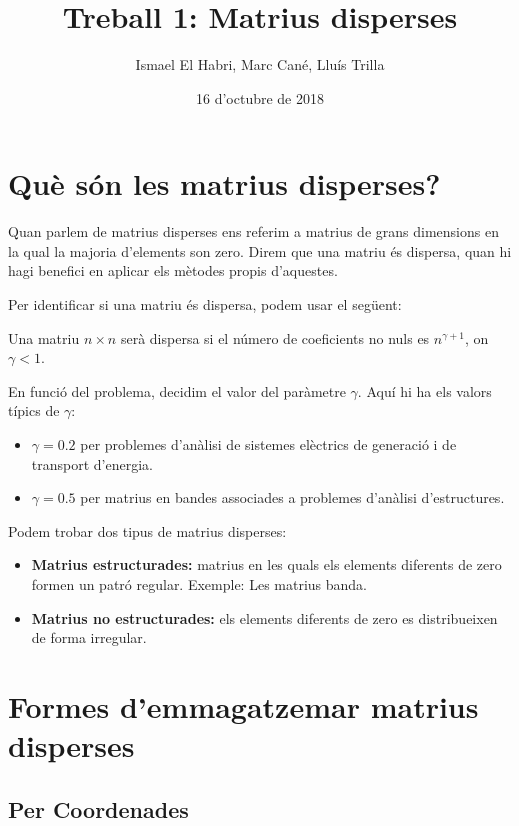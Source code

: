 \documentclass[11pt,a4paper,twoside]{report}
\begin{document}
\title{Treball 1: Matrius disperses}
\author{Ismael El Habri, Marc Cané, Lluís Trilla}
\date{16 d'octubre de 2018}
\maketitle

\tableofcontents


\chapter{Què són les matrius disperses?}

Quan parlem de matrius disperses ens referim a matrius de grans dimensions en la qual la majoria d'elements son zero. Direm que una matriu és dispersa, quan hi hagi benefici en aplicar els mètodes propis d'aquestes. 

Per identificar si una matriu és dispersa, podem usar el següent:

\qquad Una matriu $n \times n$ serà dispersa si el número de coeficients no nuls es $n^{\gamma+1}$, on $\gamma < 1$.

En funció del problema, decidim el valor del paràmetre $\gamma$. Aquí hi ha els valors típics de $\gamma$:
\begin{itemize}
\item $\gamma=0.2$ per problemes d'anàlisi de sistemes elèctrics de generació i de transport d'energia.
\item $\gamma=0.5$ per matrius en bandes associades a problemes d'anàlisi d'estructures.
\end {itemize}



Podem trobar dos tipus de matrius disperses:
\begin{itemize}
\item \textbf{Matrius estructurades:} matrius en les quals els elements diferents de zero formen un patró regular. Exemple: Les matrius banda.
\item \textbf{Matrius no estructurades:} els elements diferents de zero es distribueixen de forma irregular.
\end{itemize}

\chapter{Formes d'emmagatzemar matrius disperses}

\section{Per Coordenades}
\end{document}
